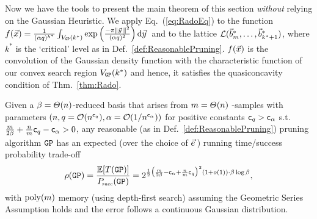 Now we have the tools to present the main theorem of this section \emph{without} relying on the Gaussian Heuristic. 
We apply Eq.~(\ref{eq:RadoEq}) to the function $f(\xvec) = \tfrac{1}{(\alpha q)^{k^*}} \int_{V_{\GP}(k^*)} \exp \left( \frac{-\pi \| \yvec \|^2}{(\alpha q)^2} \right) \d \yvec$ and to the lattice $\mathcal{L}(\vec b^*_m, \ldots, \vec b^*_{k^*+1})$, where $k^*$ is the `critical' level as in Def.~\ref{def:ReasonablePruning}. $f(\vec x)$ is the convolution of the Gaussian density function with the characteristic function of our convex search region $V_{\texttt{GP}}(k^*)$ and hence, it satisfies the quasiconcavity condition of Thm.~\ref{thm:Rado}. 

\begin{thm} \label{thm:GenPrunRunTime}
Given a $\beta = \varTheta(n)$-\BKZ reduced basis that arises from $m = \varTheta(n)$ \LWE-samples with parameters $(n, q=\mathcal{O}(n^{\mathsf{c}_q}), \alpha = \mathcal{O}(1 / n^{\mathsf{c}_{\alpha}}) )$ for positive constants $\mathsf{c}_q >\mathsf{c}_{\alpha}$ s.t.\ $\frac{m}{2 \beta} + \frac{n}{m} \mathsf{c}_q - \mathsf{c}_{\alpha} >0$, any reasonable (as in Def.~\ref{def:ReasonablePruning}) pruning algorithm $\texttt{GP}$ has an expected (over the choice of $\evec$) running time/success probability trade-off
\[
	\rho(\texttt{GP}) = \frac{\operatorname*{\mathbb{E}}[T(\texttt{GP})]}{P\mkern-4mu_{\mbox{\tiny succ}}(\texttt{GP})} = 2^{\frac{1}{2} \bigl(\frac{m}{2\beta}-\mathsf{c}_{\alpha} + \frac{n}{m} \mathsf{c}_q  \bigr)^2 (1+o(1)) \cdot \beta\log\beta},
\]
with $\mathrm{poly}(m)$ memory (using depth-first search) assuming the Geometric Series Assumption holds and the \LWE error follows a continuous Gaussian distribution.
\end{thm}

